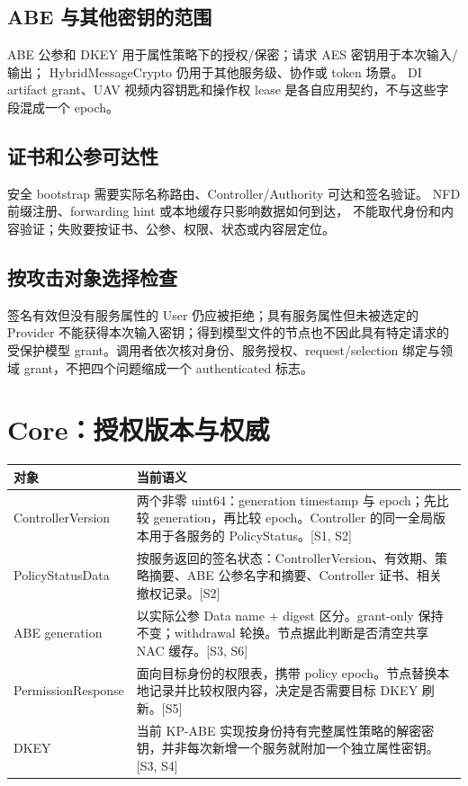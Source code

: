 \subsection{ABE 与其他密钥的范围}
ABE 公参和 DKEY 用于属性策略下的授权/保密；请求 AES 密钥用于本次输入/输出；
HybridMessageCrypto 仍用于其他服务级、协作或 token 场景。
DI artifact grant、UAV 视频内容钥匙和操作权 lease 是各自应用契约，不与这些字段混成一个 epoch。

\subsection{证书和公参可达性}
安全 bootstrap 需要实际名称路由、Controller/Authority 可达和签名验证。
NFD 前缀注册、forwarding hint 或本地缓存只影响数据如何到达，
不能取代身份和内容验证；失败要按证书、公参、权限、状态或内容层定位。


\subsection{按攻击对象选择检查}
签名有效但没有服务属性的 User 仍应被拒绝；具有服务属性但未被选定的 Provider 不能获得本次输入密钥；得到模型文件的节点也不因此具有特定请求的受保护模型 grant。调用者依次核对身份、服务授权、request/selection 绑定与领域 grant，不把四个问题缩成一个 authenticated 标志。

\newpage

\section{Core：授权版本与权威}
\begin{tabularx}{\linewidth}{@{}p{36mm}X@{}}
\toprule
对象 & 当前语义 \\
\midrule
ControllerVersion & 两个非零 uint64：generation timestamp 与 epoch；先比较 generation，再比较 epoch。Controller 的同一全局版本用于各服务的 PolicyStatus。[S1, S2]\\
PolicyStatusData & 按服务返回的签名状态：ControllerVersion、有效期、策略摘要、ABE 公参名字和摘要、Controller 证书、相关撤权记录。[S2]\\
ABE generation & 以实际公参 Data name + digest 区分。grant-only 保持不变；withdrawal 轮换。节点据此判断是否清空共享 NAC 缓存。[S3, S6]\\
PermissionResponse & 面向目标身份的权限表，携带 policy epoch。节点替换本地记录并比较权限内容，决定是否需要目标 DKEY 刷新。[S5]\\
DKEY & 当前 KP-ABE 实现按身份持有完整属性策略的解密密钥，并非每次新增一个服务就附加一个独立属性密钥。[S3, S4]\\
\bottomrule
\end{tabularx}

